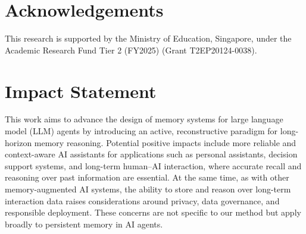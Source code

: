 \documentclass{llmxive}
\begin{document}



\section*{Acknowledgements}

This research is supported by the Ministry of Education, Singapore, under the Academic Research Fund Tier 2 (FY2025) (Grant T2EP20124-0038).

\section*{Impact Statement}

This work aims to advance the design of memory systems for large language model (LLM) agents by introducing an active, reconstructive paradigm for long-horizon memory reasoning.
Potential positive impacts include more reliable and context-aware AI assistants for applications such as personal assistants, decision support systems, and long-term human–AI interaction, where accurate recall and reasoning over past information are essential.
At the same time, as with other memory-augmented AI systems, the ability to store and reason over long-term interaction data raises considerations around privacy, data governance, and responsible deployment. These concerns are not specific to our method but apply broadly to persistent memory in AI agents.
\end{document}
